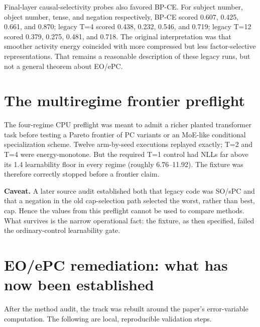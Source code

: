 \documentclass[10pt,a4paper]{article}
\newcommand{\caveat}{\textbf{Caveat.} }
\begin{document}
Final-layer causal-selectivity probes also favored BP-CE.  For subject number,
object number, tense, and negation respectively, BP-CE scored 0.607, 0.425,
0.661, and 0.870; legacy T=4 scored 0.438, 0.232, 0.546, and 0.719; legacy
T=12 scored 0.379, 0.275, 0.481, and 0.718.  The original interpretation was
that smoother activity energy coincided with more compressed but less
factor-selective representations.  That remains a reasonable description of
these legacy runs, but not a general theorem about EO/ePC.

\section{The multiregime frontier preflight}
The four-regime CPU preflight was meant to admit a richer planted transformer
task before testing a Pareto frontier of PC variants or an MoE-like conditional
specialization scheme.  Twelve arm-by-seed executions replayed exactly; T=2 and
T=4 were energy-monotone.  But the required T=1 control had NLLs far above its
1.4 learnability floor in every regime (roughly 6.76--11.92).  The fixture was
therefore correctly stopped before a frontier claim.

\caveat A later source audit established both that legacy code was SO/sPC and
that a negation in the old cap-selection path selected the worst, rather than
best, cap.  Hence the values from this preflight cannot be used to compare
methods.  What survives is the narrow operational fact: the fixture, as then
specified, failed the ordinary-control learnability gate.

\section{EO/ePC remediation: what has now been established}
After the method audit, the track was rebuilt around the paper's error-variable
computation.  The following are local, reproducible validation steps.
\end{document}
